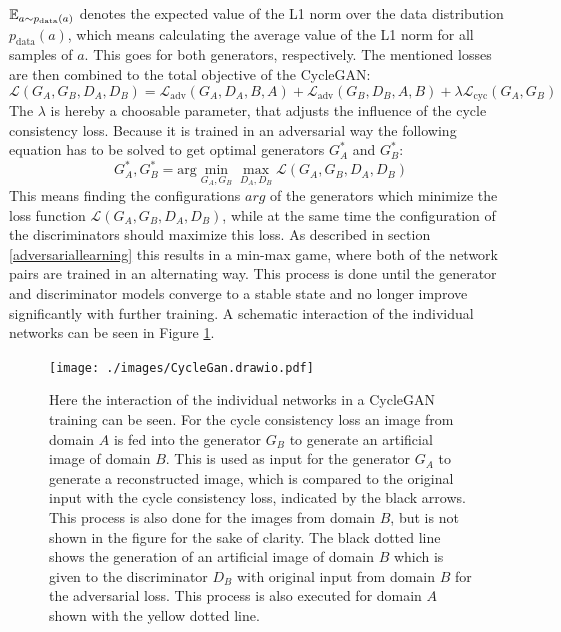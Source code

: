 $\mathbb{E}_{a\sim p_{\text{\text{data}}}(a)}$ denotes the expected value of the L1 norm over the data distribution $p_{\text{data}}(a)$, which means calculating the average value of the L1 norm for all samples of $a$.
This goes for both generators, respectively.
The mentioned losses are then combined to the total objective of the CycleGAN:
\begin{equation}
    \mathcal{L}(G_A, G_B, D_A, D_B) = \mathcal{L}_{\text{adv}}(G_A,D_A,B,A) + \mathcal{L}_{\text{adv}}(G_B,D_B,A,B) + \lambda \mathcal{L}_{\text{cyc}}(G_A, G_B)
    \label{objective_cyclegan}
\end{equation}
The $\lambda$ is hereby a choosable parameter, that adjusts the influence of the cycle consistency loss.
Because it is trained in an adversarial way the following equation has to be solved to get optimal generators $G_A^\ast$ and $G_B^\ast$:
\begin{equation}
    G_A^\ast, G_B^\ast = \text{arg} \underset{G_A, G_B}{\min}\underset{D_A, D_B}{\max}\mathcal{L}(G_A, G_B, D_A, D_B)
\end{equation}
This means finding the configurations $arg$ of the generators which minimize the loss function $\mathcal{L}(G_A, G_B, D_A, D_B)$, while at the same time the configuration of the discriminators should maximize this loss.
As described in section \ref{adversariallearning} this results in a min-max game, where both of the network pairs are trained in an alternating way.
This process is done until the generator and discriminator models converge to a stable state and no longer improve significantly with further training.
A schematic interaction of the individual networks can be seen in Figure \ref{cycle_gan_fig}.\\
\begin{figure}[bt]
    \begin{center}
     \texttt{[image: ./images/CycleGan.drawio.pdf]}
    \caption[CycleGAN structure.]{{Here the interaction of the individual networks in a CycleGAN training can be seen. 
    For the cycle consistency loss an image from domain $A$ is fed into the generator $G_B$ to generate an artificial image of domain $B$.
    This is used as input for the generator $G_A$ to generate a reconstructed image, which is compared to the original input with the cycle consistency loss, indicated by the black arrows.
    This process is also done for the images from domain $B$, but is not shown in the figure for the sake of clarity.
    The black dotted line shows the generation of an artificial image of domain $B$ which is given to the discriminator $D_B$ with original input from domain $B$ for the adversarial loss.
    This process is also executed for domain $A$ shown with the yellow dotted line. 
    }\label{cycle_gan_fig}}
    \end{center}
\end{figure}
